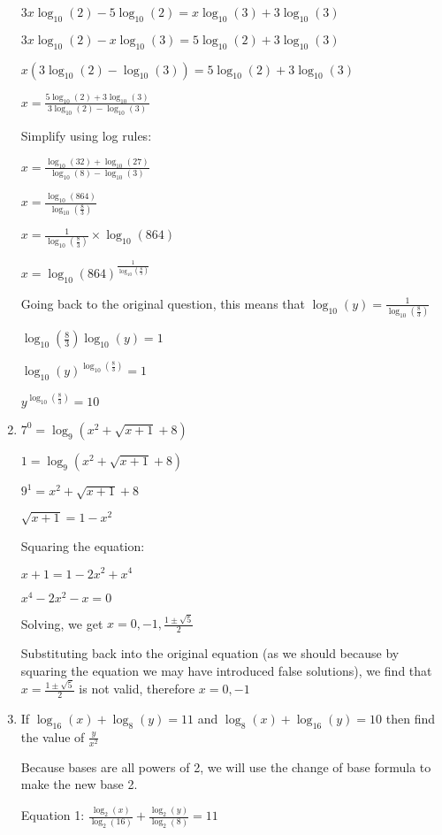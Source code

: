 \documentclass[../main.tex]{subfiles}
\begin{document}
\begin{enumerate}[itemsep=0.4cm]
    \(3x\log_{10}(2)-5\log_{10}(2)=x\log_{10}(3)+3\log_{10}(3)\)

    \(3x\log_{10}(2)-x\log_{10}(3)=5\log_{10}(2)+3\log_{10}(3)\)

    \(x(3\log_{10}(2)-\log_{10}(3))=5\log_{10}(2)+3\log_{10}(3)\)

    \(x=\frac{5\log_{10}(2)+3\log_{10}(3)}{3\log_{10}(2)-\log_{10}(3)}\)

    Simplify using log rules:

    \(x=\frac{\log_{10}(32)+\log_{10}(27)}{\log_{10}(8)-\log_{10}(3)}\)

    \(x=\frac{\log_{10}(864)}{\log_{10}(\frac{8}{3})}\)

    \(x=\frac{1}{\log_{10}(\frac{8}{3})}\times \log_{10}(864)\)

    \(x=\log_{10}(864)^{\frac{1}{\log_{10}(\frac{8}{3})}}\)

    Going back to the original question, this means that $\log_{10}(y)=\frac{1}{\log_{10}(\frac{8}{3})}$

    \(\log_{10}(\frac{8}{3})\log_{10}(y)=1\)

    \(\log_{10}(y)^{\log_{10}(\frac{8}{3})} = 1\)

    \(y^{\log_{10}(\frac{8}{3})}=10\)



    \item 
    \(7^0=\log_9(x^2+\sqrt{x+1}+8)\)

    \(1=\log_9(x^2+\sqrt{x+1}+8)\)

    \(9^1=x^2+\sqrt{x+1}+8 \)

    \(\sqrt{x+1}=1-x^2\)

    Squaring the equation:

    \(x+1=1-2x^2+x^4\)

    \(x^4-2x^2-x=0\)

    Solving, we get $x=0, -1, \frac{1\pm\sqrt{5}}{2}$

    Substituting back into the original equation (as we should because by squaring the equation we may have introduced false solutions), we find that $x=\frac{1\pm \sqrt{5}}{2}$ is not valid, therefore $x=0,-1$

    \item 
    If $\log_{16}(x)+\log_8(y)=11$ and $\log_8(x)+\log_{16}(y)=10$ then find the value of $\frac{y}{x^2}$

    Because bases are all powers of 2, we will use the change of base formula to make the new base 2.

    Equation 1: $\frac{\log_2(x)}{\log_2(16)}+\frac{\log_2(y)}{\log_2(8)}=11 $


\end{enumerate}
\end{document}
